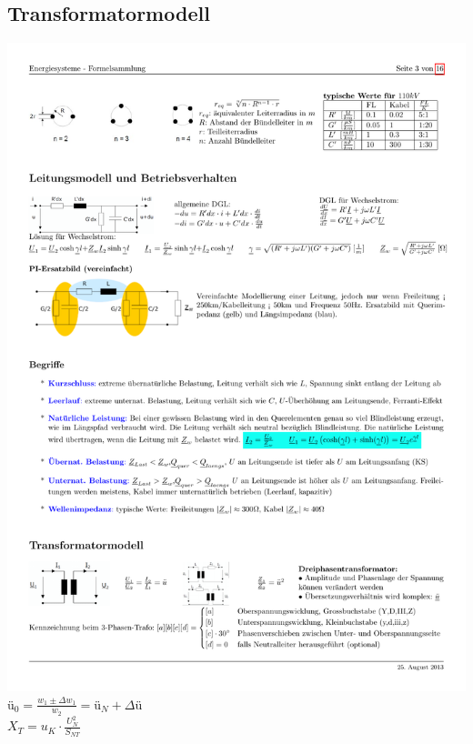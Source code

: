 	\subsection{Transformatormodell}
		\includegraphics[width=\textwidth]{./images/Trafomodell.pdf}
		ü$_0 = \frac{w_1 \pm \Delta w_1}{w_2} = $ü$_N + \Delta$ü \\
		$X_T = u_K \cdot \frac{U_N^2}{S_{NT}}$

